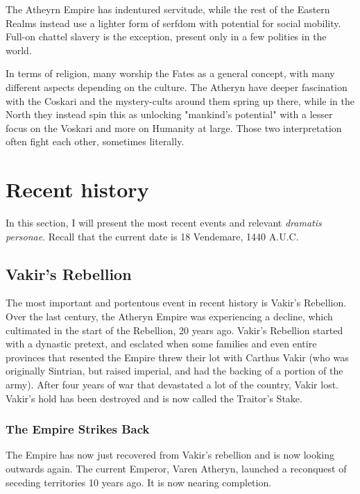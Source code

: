 The Atheyrn Empire has indentured servitude, while the rest of the Eastern Realms instead use a lighter form of serfdom with potential for social mobility. Full-on chattel slavery is the exception, present only in a few polities in the world.

In terms of religion, many worship the Fates as a general concept, with many different aspects depending on the culture. The Atheryn have deeper fascination with the Coskari and the mystery-cults around them spring up there, while in the North they instead spin this as unlocking "mankind's potential" with a lesser focus on the Voskari and more on Humanity at large. Those two interpretation often fight each other, sometimes literally.


\section{Recent history}

\label{recent_history}

In this section, I will present the most recent events and relevant \textit{dramatis personae}. Recall that the current date is 18 Vendemare, 1440 A.U.C.

\subsection{Vakir's Rebellion}

The most important and portentous event in recent history is Vakir's Rebellion. Over the last century, the Atheryn Empire was experiencing a decline, which cultimated in the start of the Rebellion, 20 years ago. Vakir's Rebellion started with a dynastic pretext, and esclated when some families and even entire provinces that resented the Empire threw their lot with Carthus Vakir (who was originally Sintrian, but raised imperial, and had the backing of a portion of the army). After four years of war that devastated a lot of the country, Vakir lost. Vakir's hold has been destroyed and is now called the Traitor's Stake.

\subsubsection{The Empire Strikes Back}

The Empire has now just recovered from Vakir's rebellion and is now looking outwards again. The current Emperor, Varen Atheryn, launched a reconquest of seceding territories 10 years ago. It is now nearing completion.

